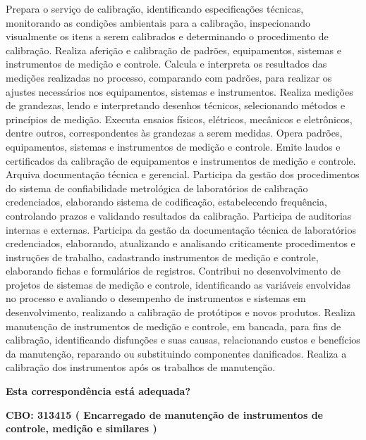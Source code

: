 \documentclass[
]{article}
\begin{document}
Prepara o serviço de calibração, identificando especificações técnicas,
monitorando as condições ambientais para a calibração, inspecionando
visualmente os itens a serem calibrados e determinando o procedimento de
calibração. Realiza aferição e calibração de padrões, equipamentos,
sistemas e instrumentos de medição e controle. Calcula e interpreta os
resultados das medições realizadas no processo, comparando com padrões,
para realizar os ajustes necessários nos equipamentos, sistemas e
instrumentos. Realiza medições de grandezas, lendo e interpretando
desenhos técnicos, selecionando métodos e princípios de medição. Executa
ensaios físicos, elétricos, mecânicos e eletrônicos, dentre outros,
correspondentes às grandezas a serem medidas. Opera padrões,
equipamentos, sistemas e instrumentos de medição e controle. Emite
laudos e certificados da calibração de equipamentos e instrumentos de
medição e controle. Arquiva documentação técnica e gerencial. Participa
da gestão dos procedimentos do sistema de confiabilidade metrológica de
laboratórios de calibração credenciados, elaborando sistema de
codificação, estabelecendo frequência, controlando prazos e validando
resultados da calibração. Participa de auditorias internas e externas.
Participa da gestão da documentação técnica de laboratórios
credenciados, elaborando, atualizando e analisando criticamente
procedimentos e instruções de trabalho, cadastrando instrumentos de
medição e controle, elaborando fichas e formulários de registros.
Contribui no desenvolvimento de projetos de sistemas de medição e
controle, identificando as variáveis envolvidas no processo e avaliando
o desempenho de instrumentos e sistemas em desenvolvimento, realizando a
calibração de protótipos e novos produtos. Realiza manutenção de
instrumentos de medição e controle, em bancada, para fins de calibração,
identificando disfunções e suas causas, relacionando custos e benefícios
da manutenção, reparando ou substituindo componentes danificados.
Realiza a calibração dos instrumentos após os trabalhos de manutenção.

\begin{Form}
\textbf{Esta correspondência está adequada?} \\ 
\end{Form}

\textbf{CBO: 313415  ( Encarregado de manutenção de instrumentos de controle, medição e similares )}
\end{document}

